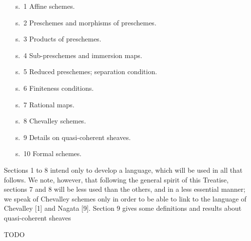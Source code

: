 \documentclass[../main.tex]{subfiles}
\begin{document}
\begin{itemize}
    \item[s.~1] Affine schemes.
    \item[s.~2] Preschemes and morphisms of preschemes.
    \item[s.~3] Products of preschemes.
    \item[s.~4] Sub-preschemes and immersion maps.
    \item[s.~5] Reduced preschemes; separation condition.
    \item[s.~6] Finiteness conditions.
    \item[s.~7] Rational maps.
    \item[s.~8] Chevalley schemes.
    \item[s.~9] Details on quasi-coherent sheaves.
    \item[s.~10] Formal schemes.
\end{itemize}

Sections 1 to 8 intend only to develop a language, which will be used in all that follows.
We note, however, that following the general spirit of this Treatise, sections 7 and 8 will be less used than the others, and in a less essential manner; we speak of Chevalley schemes only in order to be able to link to the language of Chevalley [1] and Nagata [9].
Section 9 gives some definitions and results about quasi-coherent sheaves

TODO
\end{document}
